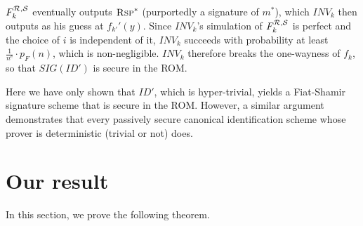 $F^{\mathcal{R},\mathcal{S}}_{k}$ eventually outputs $\textsc{Rsp}^*$
(purportedly a signature of $m^*$), which $INV_k$ then outputs 
as his guess at 
$f_{k'}'(y)$. Since $INV_k$'s simulation of $F^{\mathcal{R},\mathcal{S}}_k$ is
perfect and the choice of $i$ is independent of it,
$INV_k$ succeeds with probability at least $\frac{1}{n^c}\cdot p_F(n)$, which
is non-negligible. $INV_k$ therefore breaks the one-wayness of $f_k$, 
so that $SIG(ID')$ is secure in the ROM.

Here we have only shown that $ID'$, which is hyper-trivial, yields a
Fiat-Shamir signature scheme that is secure in the ROM. However, a similar
argument demonstrates that every passively secure canonical identification
scheme whose prover is deterministic (trivial or not) does. 
%
\section{Our result}
\label{SEC:OurResult}
In this section, we prove the following theorem.

